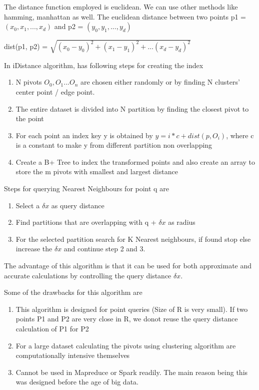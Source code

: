\documentclass[conference]{IEEEtran}
\begin{document}
\medskip

The distance function employed is euclidean. We can use other methods
like hamming, manhattan as well. The euclidean distance between two
points p1 = $(x_0, x_1, ... , x_d)$ and p2 = $(y_0, y_1, ..., y_d)$

\bigskip
dist(p1, p2) = $\sqrt{(x_0 - y_0)^2 + (x_1 - y_1)^2 + ... (x_d - y_d)^2}$
\bigskip

In iDistance algorithm, has following steps for creating the index
\begin{enumerate}
\item N pivots $O_0, O_1 ... O_n$ are chosen either randomly or by finding N clusters'
  center point / edge point.
\item The entire dataset is divided into N partition by finding the
  closest pivot to the point
\item For each point an index key y is obtained by
$y = i*c + dist(p, O_i)$, where c is a constant to make y from
different partition non overlapping
\item Create a B+ Tree to index the transformed points and also create
  an array to store the m pivots with smallest and largest distance
\end{enumerate}

\bigskip

Steps for querying Nearest Neighbours for point q are
\begin{enumerate}
\item Select a $\delta{x}$ as query distance
\item Find partitions that are overlapping with q + $\delta{x}$ as
  radius
\item For the selected partition search for K Nearest neighbours, if
  found stop else increase the $\delta{x}$ and continue step 2 and
  3.
\end{enumerate}

\bigskip
The advantage of this algorithm is that it can be used for both
approximate and accurate calculations by controlling the query
distance $\delta{x}$.

Some of the drawbacks for this algorithm are
\begin{enumerate}
\item This algorithm is designed for point queries (Size of R
  is very small). If two points P1 and P2 are very close in R, we donot reuse the query
distance calculation of P1 for P2
\item For a large dataset calculating the pivots using clustering algorithm are
  computationally intensive themselves
\item Cannot be used in Mapreduce or Spark readily. The main reason being this
  was designed before the age of big data.
\end{enumerate}
\end{document}
